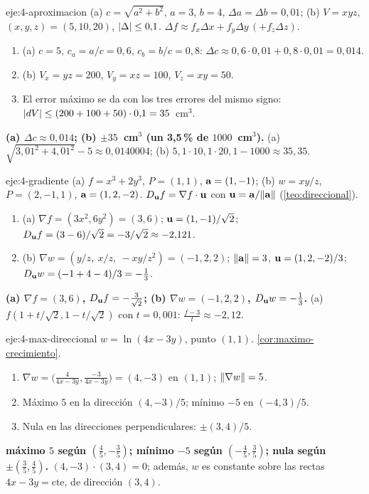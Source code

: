 \begin{solucion}{eje:4-aproximacion}
\datos (a) $c=\sqrt{a^2+b^2}$, $a=3$, $b=4$, $\Delta a=\Delta b=0{,}01$; (b) $V=xyz$, $(x,y,z)=(5,10,20)$, $\lvert\Delta\rvert\le0{,}1$.
\planteamiento $\Delta f\approx f_x\Delta x+f_y\Delta y\,(+f_z\Delta z)$.
\pasos
\begin{enumerate}[label=\arabic*.]
  \item (a) $c=5$, $c_a=a/c=0{,}6$, $c_b=b/c=0{,}8$: $\Delta c\approx0{,}6\cdot0{,}01+0{,}8\cdot0{,}01=0{,}014$.
  \item (b) $V_x=yz=200$, $V_y=xz=100$, $V_z=xy=50$.
  \item El error máximo se da con los tres errores del mismo signo: $\lvert dV\rvert\le(200+100+50)\cdot0{,}1=35$~cm$^3$.
\end{enumerate}
\resultado \textbf{(a) $\Delta c\approx0{,}014$; (b) $\pm35$~cm$^3$ (un 3{,}5\,\% de $1000$~cm$^3$).}
\comprobacion (a) $\sqrt{3{,}01^2+4{,}01^2}-5\approx0{,}0140004$; (b) $5{,}1\cdot10{,}1\cdot20{,}1-1000\approx35{,}35$.
\end{solucion}

\begin{solucion}{eje:4-gradiente}
\datos (a) $f=x^3+2y^3$, $P=(1,1)$, $\mathbf{a}=(1,-1)$; (b) $w=xy/z$, $P=(2,-1,1)$, $\mathbf{a}=(1,2,-2)$.
\planteamiento $D_{\mathbf{u}}f=\nabla f\cdot\mathbf{u}$ con $\mathbf{u}=\mathbf{a}/\lVert\mathbf{a}\rVert$ (\cref{teo:direccional}).
\pasos
\begin{enumerate}[label=\arabic*.]
  \item (a) $\nabla f=(3x^2,6y^2)=(3,6)$; $\mathbf{u}=(1,-1)/\sqrt2$; $D_{\mathbf{u}}f=(3-6)/\sqrt2=-3/\sqrt2\approx-2{,}121$.
  \item (b) $\nabla w=(y/z,\ x/z,\ -xy/z^2)=(-1,2,2)$; $\lVert\mathbf{a}\rVert=3$, $\mathbf{u}=(1,2,-2)/3$; $D_{\mathbf{u}}w=(-1+4-4)/3=-\frac13$.
\end{enumerate}
\resultado \textbf{(a) $\nabla f=(3,6)$, $D_{\mathbf{u}}f=-\frac{3}{\sqrt2}$; (b) $\nabla w=(-1,2,2)$, $D_{\mathbf{u}}w=-\frac13$.}
\comprobacion (a) $f(1+t/\sqrt2,1-t/\sqrt2)$ con $t=0{,}001$: $\frac{f-3}{t}\approx-2{,}12$.
\end{solucion}

\begin{solucion}{eje:4-max-direccional}
\datos $w=\ln(4x-3y)$, punto $(1,1)$.
\planteamiento \cref{cor:maximo-crecimiento}.
\pasos
\begin{enumerate}[label=\arabic*.]
  \item $\nabla w=\bigl(\frac{4}{4x-3y},\frac{-3}{4x-3y}\bigr)=(4,-3)$ en $(1,1)$; $\lVert\nabla w\rVert=5$.
  \item Máximo $5$ en la dirección $(4,-3)/5$; mínimo $-5$ en $(-4,3)/5$.
  \item Nula en las direcciones perpendiculares: $\pm(3,4)/5$.
\end{enumerate}
\resultado \textbf{máximo $5$ según $(\frac45,-\frac35)$; mínimo $-5$ según $(-\frac45,\frac35)$; nula según $\pm(\frac35,\frac45)$.}
\comprobacion $(4,-3)\cdot(3,4)=0$; además, $w$ es constante sobre las rectas $4x-3y=\text{cte}$, de dirección $(3,4)$.
\end{solucion}

